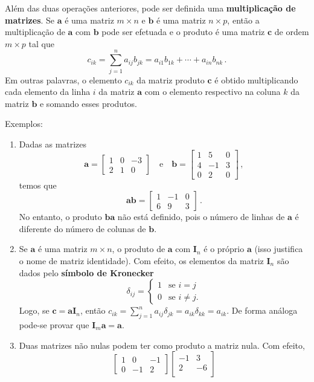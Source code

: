 \documentclass[12pt,a4paper]{report}
\newcommand{\tb}{\textbf}
\newcommand{\mb}{\mathbf}
\begin{document}
Além das duas operações anteriores, pode ser definida uma \tb{multiplicação de matrizes}. Se $\mb a$ é uma matriz $m\times n$ e $\mb b$ é uma matriz $n\times p$, então a multiplicação de $\mb a$ com $\mb b$ pode ser efetuada e o produto é uma matriz $\mb c$ de ordem $m\times p$ tal que
$$c_{ik}=\sum_{j=1}^na_{ij}b_{jk}=a_{i1}b_{1k}+\cdots+a_{in}b_{nk}\,.$$
Em outras palavras, o elemento $c_{ik}$ da matriz produto $\mb c$ é obtido multiplicando cada elemento da linha $i$ da matriz $\mb a$ com o elemento respectivo na coluna $k$ da matriz $\mb b$ e somando esses produtos.

Exemplos:
\begin{enumerate}
  \item Dadas as matrizes
  $$\mb a=\begin{bmatrix}
    1&0&-3\\
    2&1&0
  \end{bmatrix}\quad\text{e}\quad\mb b=\begin{bmatrix}
    1&5&0\\
    4&-1&3\\
    0&2&0
  \end{bmatrix}\,,$$
  temos que
  $$\mb {ab}=\begin{bmatrix}
    1&-1&0\\
    6&9&3
  \end{bmatrix}\,.$$
  No entanto, o produto $\mb{ba}$ não está definido, pois o número de linhas de $\mb a$ é diferente do número de colunas de $\mb b$.
  \item Se $\mb a$ é uma matriz $m\times n$, o produto de $\mb a$ com $\mb I_n$ é o próprio $\mb a$ (isso justifica o nome de matriz identidade). Com efeito, os elementos da matriz $\mb I_n$ são dados pelo \tb{símbolo de Kronecker}
  $$\delta_{ij}=\begin{cases}
    1&\text{se $i=j$}\\
    0&\text{se $i\ne j$.}
  \end{cases}$$
  Logo, se $\mb c=\mb {aI}_n$, então $c_{ik}=\sum_{j=1}^na_{ij}\delta_{jk}=a_{ik}\delta_{kk}=a_{ik}$. De forma análoga pode-se provar que $\mb I_m\mb a=\mb a$.
  \item Duas matrizes não nulas podem ter como produto a matriz nula. Com efeito,
  $$\begin{bmatrix}
    1&0&-1\\
    0&-1&2
  \end{bmatrix}\begin{bmatrix}
    -1&3\\
    2&-6\\

\end{bmatrix}$$
\end{enumerate}
\end{document}
